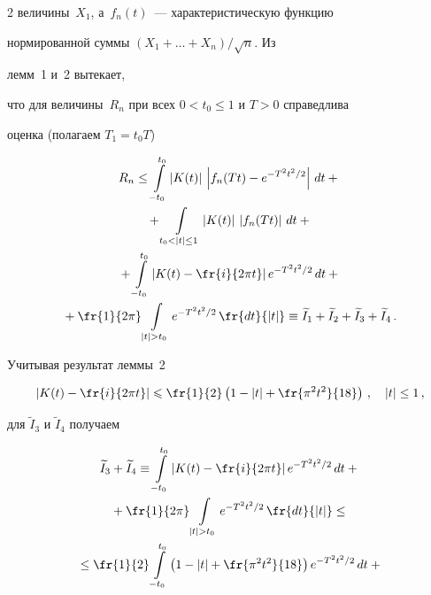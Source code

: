 \begin{multicols}{2}
величины~$X_1$, а~$f_n(t)$~--- характеристическую функцию


нормированной суммы ${(X_1+\ldots+X_n)/\sqrt n}$. Из


лемм~1 и~2 вытекает,


что для величины~$R_n$ при всех ${0<t_0\le1}$ и $T>0$ справедлива


оценка (полагаем $T_1=t_0T$)


\begin{multline*}


R_n\le \int\limits_{-t_0}^{t_0}{\left|K(t)\right|\,\left|f_n(Tt)-e^{-T^2t^2/2}\right|\,dt}+{}\\


{}+\int\limits_{t_0<|t|\le1}{\left|K(t)\right|\,\left|f_n(Tt)\right|\,dt}+{}\\


{}+\int\limits_{-t_0}^{t_0}{\left|K(t)-\fr {i}{2\pi t}\right|e^{-T^2t^2/2}\,dt}+{}\\


{}+ \fr{1}{2\pi}


\int\limits_{|t|>t_0}{e^{-T^2t^2/2}\,\fr{dt}{|t|}}\equiv


\widetilde I_1+ \widetilde I_2+\widetilde I_3+\widetilde I_4\,.


\end{multline*}


Учитывая результат леммы~2


$$


\left| K(t)-\fr{i}{2\pi t}\right| \leqslant \fr{1}{2}\left(1-|t|+


\fr{\pi^2t^2}{18}\right)\,,\quad |t|\le1\,,


$$


для $\widetilde I_3$ и $\widetilde I_4$ получаем


\begin{multline*}


\widetilde I_3+\widetilde I_4\equiv \int\limits_{-t_0}^{t_0}{\left|K(t)-\fr{i}{2\pi


t}\right|e^{-T^2t^2/2}\,dt}+{}\\


{}+


 \fr{1}{2\pi} \int\limits_{|t|>t_0}{e^{-T^2t^2/2}\,\fr{dt}{|t|}}\le{}\\


{}\le\fr{1}{2}\int\limits_{-t_0}^{t_0} {\left(1-|t|+\fr{\pi^2t^2}{18}\right)


e^{-T^2t^2/2}\,dt}+{}\\



\end{multline*}
\end{multicols}
